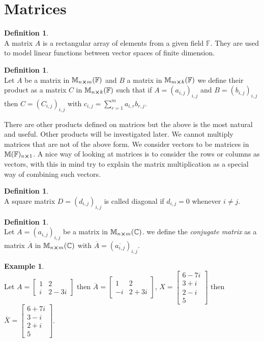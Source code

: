 \documentclass[12pt]{article}
\theoremstyle{definition}
\newtheorem{definition}[theorem]{Definition}
\newtheorem*{example}{Example}
\theoremstyle{remark}
\theoremstyle{plain}
\begin{document}
\section{Matrices}
\begin{definition}\leavevmode \\
	A matrix $A$ is a rectangular array of elements from a given field $\mathbb{F}$. They are used to model linear functions between vector spaces of finite dimension. 
\end{definition}
\begin{definition}\leavevmode \\
	Let $A$ be a matrix in $\mathbb{M}_{n\cross m}(\mathbb{F})$ and $B$ a matrix in $\mathbb{M}_{m\cross k}(\mathbb{F})$ we define their product as a matrix $C$ in $\mathbb{M}_{n\cross k}(\mathbb{F})$ such that if $A=(a_{i,j})_{i,j}$ and $B=(b_{i,j})_{i,j}$ then $C=(C_{i,j})_{i,j}$ with $c_{i,j}=\sum\limits_{r=1}^m a_{i,r}b_{r,j}$.
\end{definition}
There are other products defined on matrices but the above is the most natural and useful. Other products will be investigated later. 
We cannot multiply matrices that are not of the above form.
We consider vectors to be matrices in $\mathbb{M}(\mathbb{F})_{n\cross 1}$.
A nice way of looking at matrices is to consider the rows or columns as vectors, with this in mind try to explain the matrix multiplication as a special way of combining such vectors.
\begin{definition}\leavevmode \\
	A square matrix $D=(d_{i,j})_{i,j}$ is called diagonal if $d_{i,j}=0$ whenever $i\neq j$.
\end{definition}
\begin{definition}\leavevmode \\
	Let $A=(a_{i,j})_{i,j}$ be a matrix in $\mathbb{M}_{n\cross m}(\mathbb{C})$. we define the \textit{conjugate matrix} as a matrix $\overline{A}$ in $\mathbb{M}_{n\cross m}(\mathbb{C})$ with $\overline{A}=(\overline{a_{i,j}})_{i,j}$.

\end{definition}
\begin{example}\leavevmode \\
    Let $A=\begin{bmatrix}
        1 & 2 \\
        i & 2-3i
    \end{bmatrix}$ then $\overline{A}=\begin{bmatrix}
        1 & 2 \\
        -i & 2+3i
    \end{bmatrix}$, $X=\begin{bmatrix}
        6-7i \\ 3+i \\ 2-i \\ 5
    \end{bmatrix}$ then $\overline{X}=\begin{bmatrix}
        6+7i \\ 3-i \\ 2+i \\ 5
    \end{bmatrix}$.
\end{example}
\end{document}
